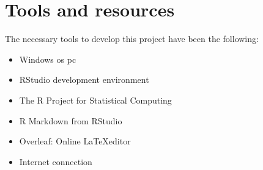 \chapter{Tools and resources}
\label{cha:tools-resources}

The necessary tools to develop this project have been the following:

\begin{itemize}
    \item Windows \acrshort{os} \acrshort{pc}
    \item RStudio development environment \cite{rstudio}
    \item The R Project for Statistical Computing \cite{r-project}
    \item R Markdown from RStudio \cite{rmarkdown}
    \item Overleaf: Online \LaTeX editor \cite{overleaf}
    \item Internet connection
\end{itemize}